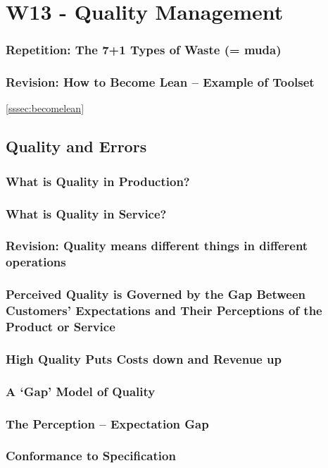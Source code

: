 \section{W13 - Quality Management}
\subsubsection{Repetition: The 7+1 Types of Waste (= muda)}
\subsubsection{Revision: How to Become Lean – Example of Toolset }
\ref{sssec:becomelean}
\subsection{Quality and Errors}
\subsubsection{What is Quality in Production? }
\subsubsection{What is Quality in Service?}
\subsubsection{Revision: Quality means different things in different operations}
\subsubsection{Perceived Quality is Governed by the Gap Between Customers’ Expectations and Their Perceptions of the Product or Service}
\subsubsection{High Quality Puts Costs down and Revenue up}
\subsubsection{A ‘Gap’ Model of Quality}
\subsubsection{The Perception – Expectation Gap}
\subsubsection{Conformance to Specification}
